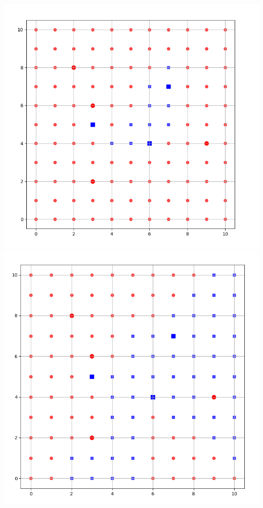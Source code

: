 \documentclass[10pt,class=report,crop=false]{standalone}
\begin{document}
\begin{activite}
\begin{enumerate}
\begin{enumerate}
\begin{center}
	\includegraphics[scale=\myscale,scale=0.13]{ecran-voisins-8c} 
	\includegraphics[scale=\myscale,scale=0.128]{ecran-voisins-8d}	
\end{center}


\end{enumerate}
\end{enumerate}
\end{activite}
\end{document}
